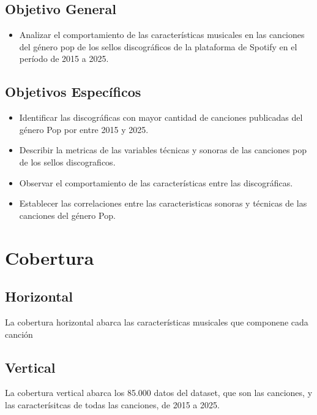 \documentclass[oneside,11pt]{Latex/Classes/PhDthesisPSnPDF}
\begin{document}
\subsection{Objetivo General}
\begin{itemize}
  \item{ Analizar el comportamiento de las características musicales en las canciones del género pop de los sellos discográficos de la plataforma de Spotify en el período de 2015 a 2025.}
\end{itemize}

\subsection{Objetivos Específicos}
\begin{itemize}
  \item{Identificar las discográficas con mayor cantidad de canciones publicadas del género Pop por entre 2015 y 2025.}
  \item{Describir la metricas de las variables técnicas y sonoras de las canciones pop de los sellos discograficos.}
  \item{Observar el comportamiento de las características entre las discográficas.}
  \item{Establecer las correlaciones entre las caracteristicas sonoras y técnicas de las canciones del género Pop.}
\end{itemize}

\section{Cobertura}

\subsection{Horizontal}

La cobertura horizontal abarca las características musicales que
componene cada canción\\

\subsection{Vertical}

La cobertura vertical abarca los 85.000 datos del dataset, que son las
canciones, y las caracterísitcas de todas las canciones, de 2015 a 2025.
\end{document}

